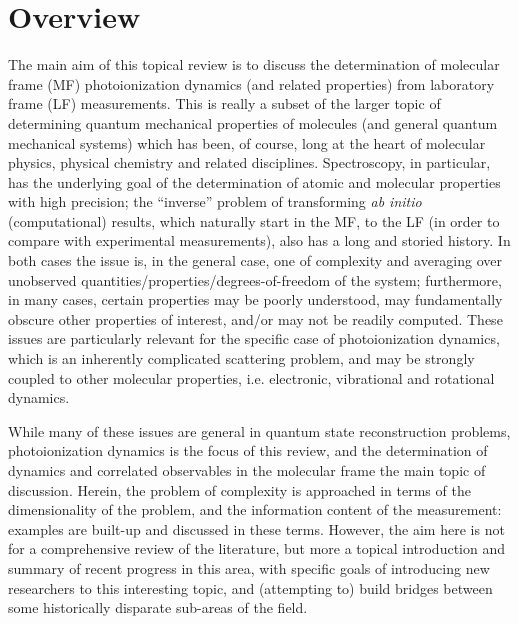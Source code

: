 \section{Overview}
The main aim of this topical review is to discuss the determination of molecular frame (MF) photoionization dynamics (and related properties) from laboratory frame (LF) measurements. This is really a subset of the larger topic of determining quantum mechanical properties of molecules (and general quantum mechanical systems) which has been, of course, long at the heart of molecular physics, physical chemistry and related disciplines. Spectroscopy, in particular, has the underlying goal of the determination of atomic and molecular properties with high precision; the “inverse” problem of transforming \textit{ab initio} (computational) results, which naturally start in the MF, to the LF (in order to compare with experimental measurements), also has a long and storied history. In both cases the issue is, in the general case, one of complexity and averaging over unobserved quantities/properties/degrees-of-freedom of the system; furthermore, in many cases, certain properties may be poorly understood, may fundamentally obscure other properties of interest, and/or may not be readily computed. These issues are particularly relevant for the specific case of photoionization dynamics, which is an inherently complicated scattering problem, and may be strongly coupled to other molecular properties, i.e. electronic, vibrational and rotational dynamics. 

While many of these issues are general in quantum state reconstruction problems, photoionization dynamics is the focus of this review, and the determination of dynamics and correlated observables in the molecular frame the main topic of discussion. Herein, the problem of complexity is approached in terms of the dimensionality of the problem, and the information content of the measurement: examples are built-up and discussed in these terms. However, the aim here is not for a comprehensive review of the literature, but more a topical introduction and summary of recent progress in this area, with specific goals of introducing new researchers to this interesting topic, and (attempting to) build bridges between some historically disparate sub-areas of the field.